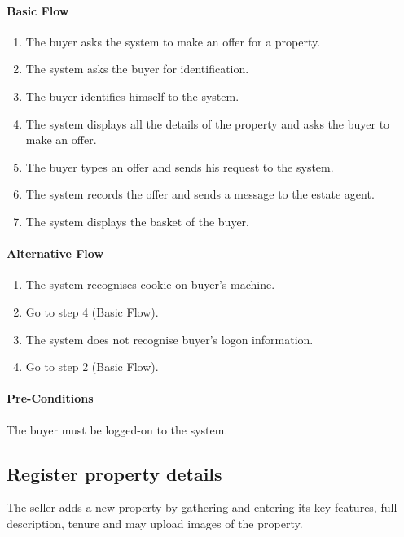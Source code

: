 \documentclass[a4paper,12pt]{article}
\begin{document}
\paragraph{Basic Flow}
\begin{enumerate}
\item The buyer asks the system to make an offer for a property.
\item The system asks the buyer for identification.
\item The buyer identifies himself to the system.
\item The system displays all the details of the property and asks the buyer to make an offer.
\item The buyer types an offer and sends his request to the system.
\item The system records the offer and sends a message to the estate agent.
\item The system displays the basket of the buyer.
\end{enumerate}
\paragraph{Alternative Flow}
\begin{enumerate}
\item The system recognises cookie on buyer's machine.
\item Go to step 4 (Basic Flow).
\item The system does not recognise buyer's logon information.
\item Go to step 2 (Basic Flow).
\end{enumerate}
\paragraph{Pre-Conditions}
The buyer must be logged-on to the system.

\subsection{Register property details}
The seller adds a new property by gathering and entering its key features, full description, tenure and may upload images of the property.
\end{document}
